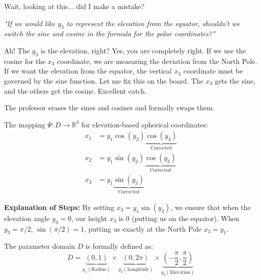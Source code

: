 \begin{spoken_clean}[00:32:00 - 00:32:53]
Wait, looking at this... did I make a mistake?
\end{spoken_clean}

\begin{meta_note}
\textit{"If we would like $y_3$ to represent the elevation from the equator, shouldn't we switch the sine and cosine in the formula for the polar coordinates?"}
\end{meta_note}

\begin{spoken_clean}[continued]
Ah! The $y_3$ is the elevation, right? Yes, you are completely right. If we use the cosine for the $x_3$ coordinate, we are measuring the deviation from the North Pole. If we want the elevation from the equator, the vertical $x_3$ coordinate must be governed by the sine function. Let me fix this on the board. The $x_3$ gets the sine, and the others get the cosine. Excellent catch.
\end{spoken_clean}

\begin{nice-box}
The professor erases the sines and cosines and formally swaps them.
\end{nice-box}

\begin{math_stroke}
The mapping $\Psi: D \to \mathbb{R}^3$ for elevation-based spherical coordinates:
\begin{align} 
x_1 &= y_1 \cos(y_2) \underbrace{\cos(y_3)}_{\text{Corrected}} \nonumber \\
x_2 &= y_1 \sin(y_2) \underbrace{\cos(y_3)}_{\text{Corrected}} \label{eq:correct_spherical} \\
x_3 &= y_1 \underbrace{\sin(y_3)}_{\text{Corrected}} \nonumber
\end{align}

\textbf{Explanation of Steps:}
By setting $x_3 = y_1 \sin(y_3)$, we ensure that when the elevation angle $y_3 = 0$, our height $x_3$ is $0$ (putting us on the equator). When $y_3 = \pi/2$, $\sin(\pi/2) = 1$, putting us exactly at the North Pole $x_3 = y_1$.

The parameter domain $D$ is formally defined as:
\[
D = \underbrace{(0,1)}_{y_1 (\text{Radius})} \times \underbrace{(0, 2\pi)}_{y_2 (\text{Longitude})} \times \underbrace{\left(-\frac{\pi}{2}, \frac{\pi}{2}\right)}_{y_3 (\text{Elevation})}
\]
\end{math_stroke}

